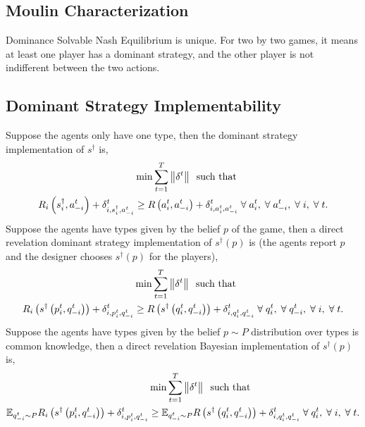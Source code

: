 \documentclass{article}
\begin{document}
\subsection{Moulin Characterization}
Dominance Solvable Nash Equilibrium is unique. For two by two games, it means at least one player has a dominant strategy, and the other player is not indifferent between the two actions.
\newline \newline


\subsection{Dominant Strategy Implementability}
Suppose the agents only have one type, then the dominant strategy implementation of  $s^{\dagger}$ is,
\begin{align*}
&\displaystyle\min \displaystyle\sum_{t=1}^{T} \left\|\delta^{t}\right\| \text{\;\text{\;such that\;}\;}
\\ R_{i}\left(s_{i}^{\dagger}, a_{-i}^{t}\right) + \delta_{i, s_{i}^{\dagger}, a_{-i}^{t}}^{t} &\geq  R\left(a_{i}^{t}, a_{-i}^{t}\right) + \delta_{i, a_{i}^{t}, a_{-i}^{t}}^{t} \;\forall\; a_{i}^{t}, \;\forall\; a_{-i}^{t}, \;\forall\; i, \;\forall\; t.
\end{align*}
Suppose the agents have types given by the belief $p $ of the game, then a direct revelation dominant strategy implementation of $s^{\dagger}\left(p\right)$ is (the agents report $p $ and the designer chooses $s^{\dagger}\left(p \right)$ for the players),
\begin{align*}
&\displaystyle\min \displaystyle\sum_{t=1}^{T} \left\|\delta^{t}\right\| \text{\;\text{\;such that\;}\;}
\\ R_{i}\left(s^{\dagger}\left(p_{i}^{t}, q_{-i}^{t}\right)\right) + \delta_{i, p_{i}^{t}, q_{-i}^{t}}^{t} &\geq  R\left(s^{\dagger}\left(q_{i}^{t}, q_{-i}^{t}\right)\right) + \delta_{i, q_{i}^{t}, q_{-i}^{t}}^{t} \;\forall\; q_{i}^{t}, \;\forall\; q_{-i}^{t}, \;\forall\; i, \;\forall\; t.
\end{align*}
Suppose the agents have types given by the belief $p  \sim  P $ distribution over types is common knowledge, then a direct revelation Bayesian implementation of $s^{\dagger}\left(p\right)$ is,
\begin{align*}
&\displaystyle\min \displaystyle\sum_{t=1}^{T} \left\|\delta^{t}\right\| \text{\;\text{\;such that\;}\;}
\\ \mathbb{E}_{q_{-i}^{t} \sim  P} R_{i}\left(s^{\dagger}\left(p_{i}^{t}, q_{-i}^{t}\right)\right) + \delta_{i, p_{i}^{t}, q_{-i}^{t}}^{t} &\geq  \mathbb{E}_{q_{-i}^{t} \sim  P} R\left(s^{\dagger}\left(q_{i}^{t}, q_{-i}^{t}\right)\right) + \delta_{i, q_{i}^{t}, q_{-i}^{t}}^{t} \;\forall\; q_{i}^{t}, \;\forall\; i, \;\forall\; t.
\end{align*}
\end{document}
